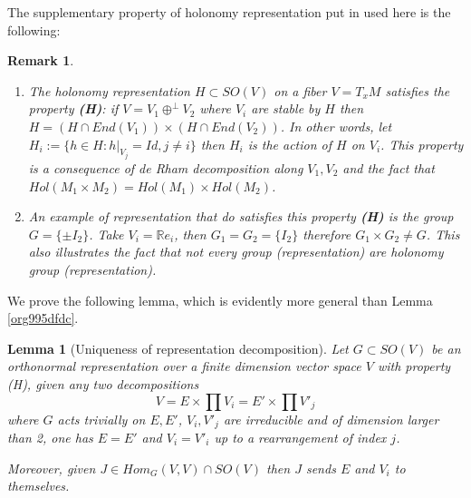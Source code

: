 \documentclass[11pt]{article}
\newtheorem{remark}{Remark}
\newtheorem{lemma}[theorem]{Lemma}
\begin{document}
The supplementary property of holonomy representation put in used here is the following:

\begin{remark}
\begin{enumerate}
\item The holonomy representation \(H\subset SO(V)\) on a fiber \(V=T_xM\) satisfies the property \textbf{(H)}: if
\(V = V_1 \oplus^\perp V_2\) where \(V_i\) are stable by \(H\) then \(H = (H\cap End(V_1))\times (H\cap
   End(V_2))\). In other words, let \(H_i:= \{ h\in H: h|_{V_j} = Id, j\ne i\}\) then \(H_i\) is the
action of \(H\) on \(V_i\). This property is a consequence of  de Rham decomposition along \(V_1, V_2\)
and the fact that \(Hol(M_1\times M_2) = Hol(M_1)\times Hol(M_2)\).
\item An example of representation that do satisfies this property \textbf{(H)} is the group \(G = \{\pm
   I_2\}\). Take \(V_i = \mathbb{R}e_i\), then \(G_1 = G_2 = \{I_2\}\) therefore \(G_1\times G_2\ne
   G\). This also illustrates the fact that not every group (representation) are holonomy group
(representation).
\end{enumerate}
\end{remark}


We prove the following lemma, which is evidently more general than Lemma \ref{org995dfdc}.
\begin{lemma}[Uniqueness of representation decomposition]
\label{lem:unique-representation}
\label{org7773dca}
Let \(G\subset SO(V)\) be an orthonormal representation over a finite dimension vector space \(V\) with
property (H), given any two decompositions
\[
V = E \times \prod V_i = E' \times \prod V'_j
\]
where \(G\) acts trivially on \(E, E'\), \(V_i, V'_j\) are irreducible and of dimension larger than 2,
one has \(E = E'\) and \(V_i = V'_i\) up to a rearrangement of index \(j\).

Moreover, given \(J\in Hom_G(V,V)\cap SO(V)\) then \(J\) sends \(E\) and \(V_i\) to themselves.
\end{lemma}
\end{document}
